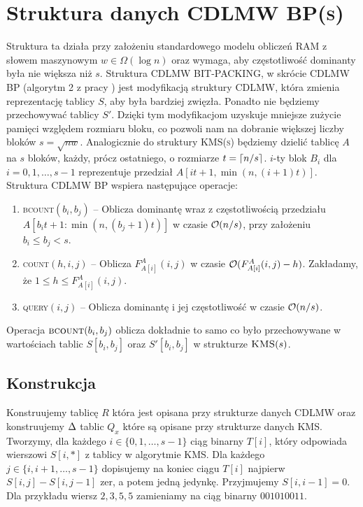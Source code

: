 \section{Struktura danych \textsc{CDLMW BP(s)}}
\label{sec:cdlmw-bp}
Struktura ta działa przy założeniu standardowego modelu obliczeń \textsc{RAM} z słowem maszynowym $w \in \Omega(\log n)$ oraz wymaga, aby częstotliwość dominanty była nie większa niż $s$.
Struktura \textsc{CDLMW BIT-PACKING}, w skrócie \textsc{CDLMW BP} (algorytm 2 z pracy \cite{chan14}) jest modyfikacją struktury \textsc{CDLMW}, która zmienia reprezentację tablicy $S$, aby była bardziej zwięzła. Ponadto nie będziemy przechowywać tablicy $S'$. Dzięki tym modyfikacjom uzyskuje mniejsze zużycie pamięci względem rozmiaru bloku, co pozwoli nam na dobranie większej liczby bloków $s=\sqrt{nw}$. Analogicznie do struktury \textsc{KMS(s)} będziemy dzielić tablicę $A$ na $s$ bloków, każdy, prócz ostatniego, o rozmiarze $t=\left\lceil n/s\right\rceil$. $i$-ty blok $B_i$ dla $i=0,1,\dots,s-1$ reprezentuje przedział $A[it+1, \min(n,(i+1)t)]$. Struktura \textsc{CDLMW BP} wspiera następujące operacje:
\begin{enumerate}[nosep]
    \item \textsc{bcount}$(b_i,b_j)$ -- Oblicza dominantę wraz z częstotliwością przedziału $A[b_it+1: \min(n,(b_j+1)t)]$ w czasie $\mathcal{O}(n/s)$, przy założeniu $b_i \le b_j < s$.
    \item \textsc{count}$(h,i,j)$ -- Oblicza $F^A_{A[i]}(i, j)$ w czasie $\mathcal{O}(F^A_{A[i]}(i, j) - h)$. Zakładamy, że $1 \le h \le F^A_{A[i]}(i,j).$
    \item \textsc{query}$(i, j)$ -- Oblicza dominantę i jej częstotliwość w czasie $\mathcal{O}(n/s)$.
\end{enumerate}
Operacja $\textsc{bcount}(b_i, b_j)$ oblicza dokładnie to samo co było przechowywane w wartościach tablic $S[b_i, b_j]$ oraz $S'[b_i, b_j]$ w strukturze $\textsc{KMS}(s)$.

\subsection{Konstrukcja}
Konstruujemy tablicę $R$ która jest opisana przy strukturze danych \textsc{CDLMW} oraz konstruujemy $\Delta$ tablic $Q_x$ które są opisane przy strukturze danych \textsc{KMS}. Tworzymy, dla każdego $i \in \{0, 1, \dots, s-1\}$ ciąg binarny $T[i]$, który odpowiada wierszowi $S[i, *]$ z tablicy w algorytmie \textsc{KMS}. Dla każdego $j \in \{i, i+1, \dots, s-1\}$ dopisujemy na koniec ciągu $T[i]$ najpierw $S[i,j] - S[i, j-1]$ zer, a potem jedną jedynkę. Przyjmujemy $S[i,i-1] = 0$. Dla przykładu wiersz $2,3,5,5$ zamieniamy na ciąg binarny $001010011$.

